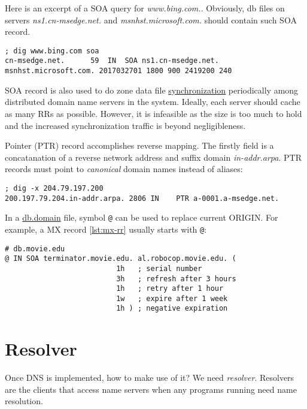 Here is an excerpt of a SOA query for
\textit{www.bing.com.}. Obviously, db files on servers
\textit{ns1.cn-msedge.net.} and \textit{msnhst.microsoft.com.}
should contain such SOA record.

\begin{lstlisting}
; dig www.bing.com soa
cn-msedge.net.		59	IN	SOA	ns1.cn-msedge.net. msnhst.microsoft.com. 2017032701 1800 900 2419200 240
\end{lstlisting}

SOA record is also used to do zone data file
\href{https://en.wikipedia.org/wiki/DNS_zone_transfer}{synchronization}
periodically among distributed domain name servers in the
system. Ideally, each server should cache as many RRs as
possible. However, it is infeasible as the size is too much to
hold and the increased synchronization traffic is beyond
negligibleness.

Pointer (PTR) record accomplishes reverse mapping. The firstly
field is a concatanation of a reverse network address and suffix
domain \textit{in-addr.arpa}. PTR records must point to
\textit{canonical} domain names instead of aliases:

\begin{lstlisting}
; dig -x 204.79.197.200
200.197.79.204.in-addr.arpa. 2806 IN	PTR	a-0001.a-msedge.net.
\end{lstlisting}

In a \uline{db.domain} file, symbol \verb|@| can be used to
replace current ORIGIN. For example, a MX record \ref{lst:mx-rr}
usually starts with \verb|@|:

\begin{minipage}{1.0\linewidth}
\begin{lstlisting}[caption={MX RR},label={lst:mx-rr}]
# db.movie.edu
@ IN SOA terminator.movie.edu. al.robocop.movie.edu. (
                          1h   ; serial number
                          3h   ; refresh after 3 hours
                          1h   ; retry after 1 hour
                          1w   ; expire after 1 week
                          1h ) ; negative expiration
\end{lstlisting}
\end{minipage}

\section{Resolver}
\label{sec:dns-resolver}

Once DNS is implemented, how to make use of it? We need
\textit{resolver}. Resolvers are the clients that access name
servers when any programs running need name resolution.

